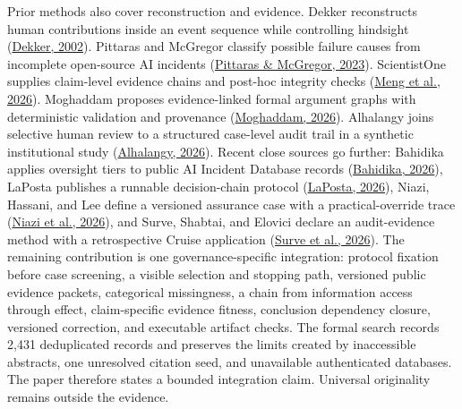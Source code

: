 \documentclass[11pt]{article}
\begin{document}
Prior methods also cover reconstruction and evidence. Dekker reconstructs human contributions inside an event sequence while controlling hindsight (\href{https://doi.org/10.1016/S0022-4375(02)00032-4}{Dekker, 2002}). Pittaras and McGregor classify possible failure causes from incomplete open-source AI incidents (\href{https://ceur-ws.org/Vol-3381/17.pdf}{Pittaras \& McGregor, 2023}). ScientistOne supplies claim-level evidence chains and post-hoc integrity checks (\href{https://doi.org/10.48550/arXiv.2605.26340}{Meng et al., 2026}). Moghaddam proposes evidence-linked formal argument graphs with deterministic validation and provenance (\href{https://doi.org/10.48550/arXiv.2604.04103}{Moghaddam, 2026}). Alhalangy joins selective human review to a structured case-level audit trail in a synthetic institutional study (\href{https://doi.org/10.3390/info17070694}{Alhalangy, 2026}). Recent close sources go further: Bahidika applies oversight tiers to public AI Incident Database records (\href{https://doi.org/10.14569/IJACSA.2026.0170502}{Bahidika, 2026}), LaPosta publishes a runnable decision-chain protocol (\href{https://doi.org/10.1609/aaaiss.v8i1.42543}{LaPosta, 2026}), Niazi, Hassani, and Lee define a versioned assurance case with a practical-override trace (\href{https://doi.org/10.3390/automation7030096}{Niazi et al., 2026}), and Surve, Shabtai, and Elovici declare an audit-evidence method with a retrospective Cruise application (\href{https://doi.org/10.48550/arXiv.2606.21276}{Surve et al., 2026}).
The remaining contribution is one governance-specific integration: protocol fixation before case screening, a visible selection and stopping path, versioned public evidence packets, categorical missingness, a chain from information access through effect, claim-specific evidence fitness, conclusion dependency closure, versioned correction, and executable artifact checks. The formal search records 2,431 deduplicated records and preserves the limits created by inaccessible abstracts, one unresolved citation seed, and unavailable authenticated databases. The paper therefore states a bounded integration claim. Universal originality remains outside the evidence.
\end{document}
